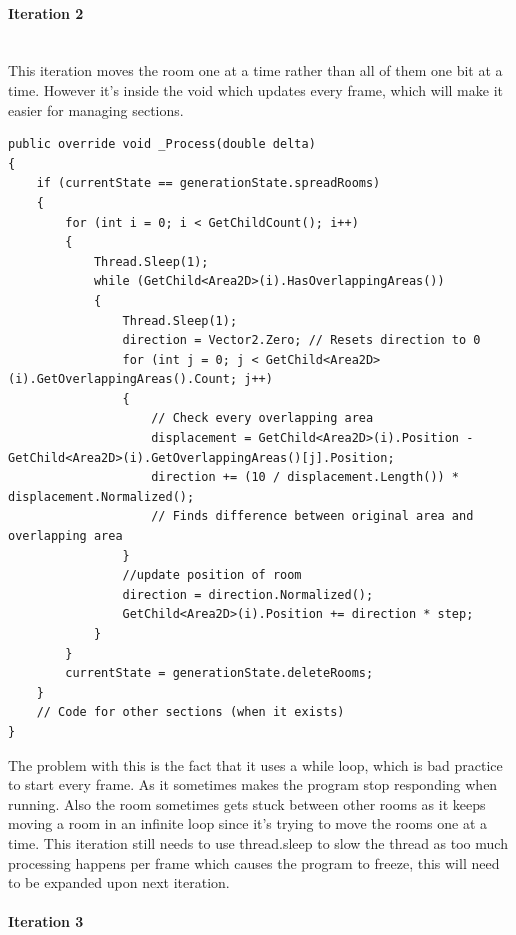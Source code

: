 \documentclass{article}
\newcommand{\myparagraph}[1]{\paragraph{#1}\mbox{}\\} %
\begin{document}
\myparagraph{Iteration 2}
This iteration moves the room one at a time rather than all of them one bit at a time. However it's inside the void which updates every frame, which will make it easier for managing sections.
\begin{lstlisting}
public override void _Process(double delta)
{
    if (currentState == generationState.spreadRooms)
    {
        for (int i = 0; i < GetChildCount(); i++)
        {
            Thread.Sleep(1);
            while (GetChild<Area2D>(i).HasOverlappingAreas())
            {
                Thread.Sleep(1);
                direction = Vector2.Zero; // Resets direction to 0
                for (int j = 0; j < GetChild<Area2D>(i).GetOverlappingAreas().Count; j++) 
                {
                	// Check every overlapping area
                    displacement = GetChild<Area2D>(i).Position - GetChild<Area2D>(i).GetOverlappingAreas()[j].Position;
                    direction += (10 / displacement.Length()) * displacement.Normalized(); 
                    // Finds difference between original area and overlapping area
                }
                //update position of room
                direction = direction.Normalized();
                GetChild<Area2D>(i).Position += direction * step;
            }
        }
        currentState = generationState.deleteRooms;
    }
    // Code for other sections (when it exists)
}
\end{lstlisting}
The problem with this is the fact that it uses a while loop, which is bad practice to start every frame. As it sometimes makes the program stop responding when running. Also the room sometimes gets stuck between other rooms as it keeps moving a room in an infinite loop since it's trying to move the rooms one at a time. This iteration still needs to use thread.sleep to slow the thread as too much processing happens per frame which causes the program to freeze, this will need to be expanded upon next iteration.

\myparagraph{Iteration 3}
\end{document}
